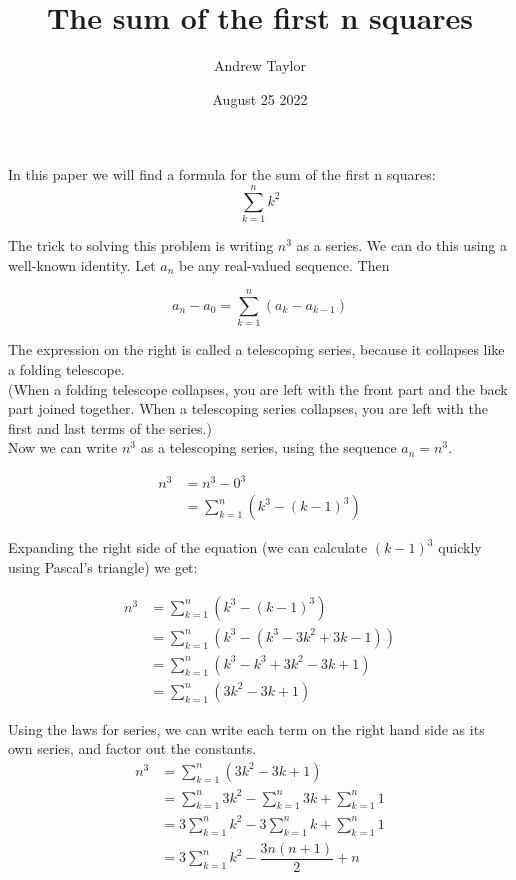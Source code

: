 \documentclass{article}
\title{The sum of the first n squares}
\author{Andrew Taylor}
\date{August 25 2022}
\begin{document}
\maketitle

In this paper we will find a formula for the sum of the first n squares: $$ \sum_{k=1}^{n} k^{2} $$

The trick to solving this problem is writing $n^3$ as a series. We can do this using a well-known identity. Let $a_n$ be any real-valued sequence. Then

\begin{equation*}
a_{n} - a_{0} = \sum_{k=1}^{n} \left( a_{k} - a_{k-1} \right)
\end{equation*}

The expression on the right is called a telescoping series, because it collapses like a folding telescope. \\

(When a folding telescope collapses, you are left with the front part and the back part joined together. When a telescoping series collapses, you are left with the first and last terms of the series.) \\

Now we can write $n^3$ as a telescoping series, using the sequence $a_{n} = n^{3}$.

\begin{align*}
n^3 &= n^3 - 0^3 \\
&= \sum_{k=1}^{n} \left( k^3 - (k-1)^3 \right)
\end{align*}

Expanding the right side of the equation (we can calculate $(k-1)^3$ quickly using Pascal's triangle) we get:

\begin{align*}
n^3 &= \sum_{k=1}^{n} \left( k^3 - (k-1)^3 \right) \\
&= \sum_{k=1}^{n} \left( k^3 - (k^3 - 3k^2 + 3k - 1) \right) \\
&= \sum_{k=1}^{n} \left( k^3 - k^3 + 3k^2 - 3k + 1 \right) \\
&= \sum_{k=1}^{n} \left( 3k^2 - 3k + 1 \right) 
\end{align*}

Using the laws for series, we can write each term on the right hand side as its own series, and factor out the constants. \\

\begin{align*}
n^3 &= \sum_{k=1}^{n} \left( 3k^2 - 3k + 1 \right) \\
&= \sum_{k=1}^{n} 3k^2 - \sum_{k=1}^{n} 3k + \sum_{k=1}^{n} 1 \\
&= 3 \sum_{k=1}^{n} k^2 - 3 \sum_{k=1}^{n} k + \sum_{k=1}^{n} 1 \\
&= 3 \sum_{k=1}^{n} k^2 - \dfrac{3n(n+1)}{2} + n \\
\end{align*}
\end{document}
